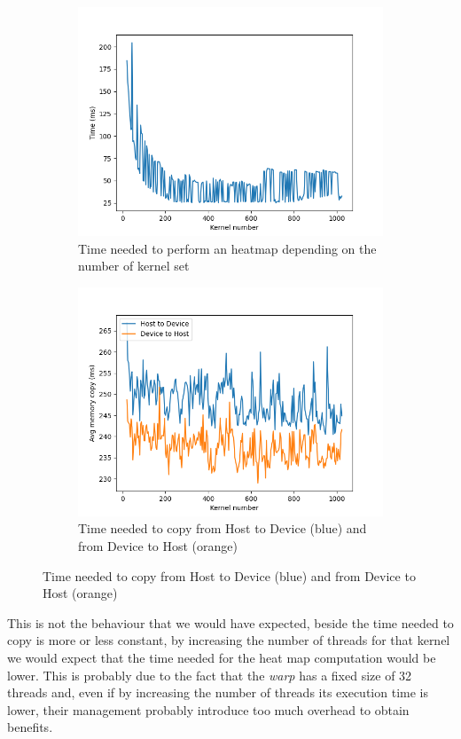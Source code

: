 \documentclass[paper=a4, fontsize=10pt]{scrartcl}	%
\begin{document}
	\begin{figure}[H]
		\centering
		\begin{subfigure}{.45\textwidth}
			\centering
			\includegraphics[width=1\linewidth]{images/heatmap/plot_kernel_times.png}
			\caption{Time needed to perform an heatmap depending on the number of kernel set}
			\label{fig:sub1}
		\end{subfigure}%
		\hspace{5mm}
		\begin{subfigure}{.45\textwidth}
			\centering
			\includegraphics[width=1\linewidth]{images/heatmap/hd.png}
			\caption{Time needed to copy from Host to Device (blue) and from Device to Host (orange)}
			\label{fig:sub2}
		\end{subfigure}
	\end{figure}
	This is not the behaviour that we would have expected, beside the time needed to copy is more or less constant, by increasing the number of threads for that kernel we would expect that the time needed for the heat map computation would be lower. This is probably due to the fact that the \textit{warp} has a fixed size of 32 threads and, even if by increasing the number of threads its execution time is lower, their management probably introduce too much overhead to obtain benefits.
	
\end{document}
